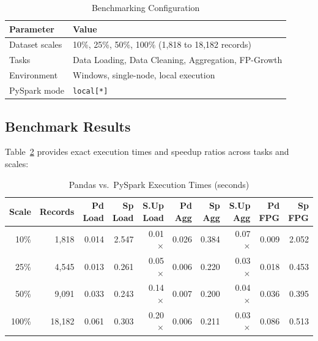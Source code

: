 \documentclass[12pt,a4paper]{article}
\begin{document}
\begin{table}[H]
\centering
\caption{Benchmarking Configuration}
\label{tab:bench_config}
\begin{tabular}{l l}
\toprule
\textbf{Parameter} & \textbf{Value} \\
\midrule
Dataset scales & 10\%, 25\%, 50\%, 100\% (1{,}818 to 18{,}182 records) \\
Tasks & Data Loading, Data Cleaning, Aggregation, FP-Growth \\
Environment & Windows, single-node, local execution \\
PySpark mode & \texttt{local[*]} \\
\bottomrule
\end{tabular}
\end{table}

\subsection{Benchmark Results}

Table~\ref{tab:benchmark} provides exact execution times and speedup ratios across tasks and scales:

\begin{table}[H]
\centering
\caption{Pandas vs.\ PySpark Execution Times (seconds)}
\label{tab:benchmark}
\small
\begin{tabular}{r r r r r r r r r r}
\toprule
\textbf{Scale} & \textbf{Records} & \makecell{\textbf{Pd}\\\textbf{Load}} & \makecell{\textbf{Sp}\\\textbf{Load}} & \makecell{\textbf{S.Up}\\\textbf{Load}} & \makecell{\textbf{Pd}\\\textbf{Agg}} & \makecell{\textbf{Sp}\\\textbf{Agg}} & \makecell{\textbf{S.Up}\\\textbf{Agg}} & \makecell{\textbf{Pd}\\\textbf{FPG}} & \makecell{\textbf{Sp}\\\textbf{FPG}} \\
\midrule
10\%  & 1{,}818  & 0.014 & 2.547 & 0.01$\times$ & 0.026 & 0.384 & 0.07$\times$ & 0.009 & 2.052 \\
25\%  & 4{,}545  & 0.013 & 0.261 & 0.05$\times$ & 0.006 & 0.220 & 0.03$\times$ & 0.018 & 0.453 \\
50\%  & 9{,}091  & 0.033 & 0.243 & 0.14$\times$ & 0.007 & 0.200 & 0.04$\times$ & 0.036 & 0.395 \\
100\% & 18{,}182 & 0.061 & 0.303 & 0.20$\times$ & 0.006 & 0.211 & 0.03$\times$ & 0.086 & 0.513 \\
\bottomrule
\end{tabular}
\end{table}
\end{document}
